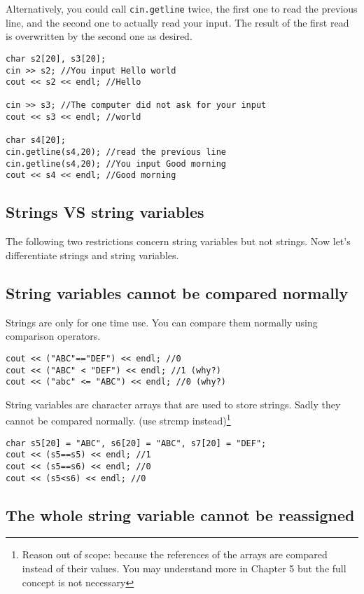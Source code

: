 Alternatively, you could call \texttt{cin.getline} twice, the first one to read the previous line, and the second one to actually read your input. The result of the first read is overwritten by the second one as desired.

\begin{lstlisting}
char s2[20], s3[20];
cin >> s2; //You input Hello world
cout << s2 << endl; //Hello

cin >> s3; //The computer did not ask for your input
cout << s3 << endl; //world

char s4[20];
cin.getline(s4,20); //read the previous line
cin.getline(s4,20); //You input Good morning
cout << s4 << endl; //Good morning
\end{lstlisting}

\subsection{Strings VS string variables}

The following two restrictions concern string variables but not strings. Now let's differentiate strings and string variables.

\subsection*{String variables cannot be compared normally}

Strings are only for one time use. You can compare them normally using comparison operators.

\begin{lstlisting}
cout << ("ABC"=="DEF") << endl; //0
cout << ("ABC" < "DEF") << endl; //1 (why?)
cout << ("abc" <= "ABC") << endl; //0 (why?)
\end{lstlisting}

String variables are character arrays that are used to store strings. Sadly they cannot be compared normally. (use strcmp instead)\footnote{Reason out of scope: because the references of the arrays are compared instead of their values. You may understand more in Chapter 5 but the full concept is not necessary}

\begin{lstlisting}
char s5[20] = "ABC", s6[20] = "ABC", s7[20] = "DEF";
cout << (s5==s5) << endl; //1
cout << (s5==s6) << endl; //0
cout << (s5<s6) << endl; //0
\end{lstlisting}

\subsection*{The whole string variable cannot be reassigned}

